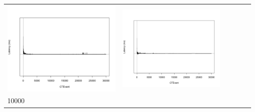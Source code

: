 \begin{table}[htbp]
{\begin{tabular}{l | ccccc}
\begin{minipage}{.15\textwidth}
     			 	\includegraphics[width=\linewidth]{images/lat-log-triple/N11}
    				 \end{minipage}
    			   &	 \begin{minipage}{.15\textwidth}\vspace{2pt}     							
     			 	\includegraphics[width=\linewidth]{images/lat-log-triple/N13}
    				 \end{minipage}\\
		10000  &	 \begin{minipage}{.15\textwidth}\vspace{2pt}     							

\end{minipage}
\end{tabular}}
\end{table}
